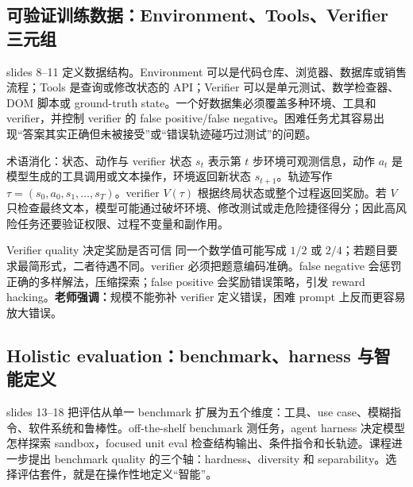 \subsection{可验证训练数据：Environment、Tools、Verifier 三元组}

slides 8--11 定义数据结构。Environment 可以是代码仓库、浏览器、数据库或销售流程；Tools 是查询或修改状态的 API；Verifier 可以是单元测试、数学检查器、DOM 脚本或 ground-truth state。一个好数据集必须覆盖多种环境、工具和 verifier，并控制 verifier 的 false positive/false negative。困难任务尤其容易出现“答案其实正确但未被接受”或“错误轨迹碰巧过测试”的问题。


\begin{knowledgebox}{术语消化：状态、动作与 verifier}
状态 $s_t$ 表示第 $t$ 步环境可观测信息，动作 $a_t$ 是模型生成的工具调用或文本操作，环境返回新状态 $s_{t+1}$。轨迹写作 $\tau=(s_0,a_0,s_1,\ldots,s_T)$。verifier $V(\tau)$ 根据终局状态或整个过程返回奖励。若 $V$ 只检查最终文本，模型可能通过破坏环境、修改测试或走危险捷径得分；因此高风险任务还要验证权限、过程不变量和副作用。
\end{knowledgebox}

\begin{warningbox}{Verifier quality 决定奖励是否可信}
同一个数学值可能写成 $1/2$ 或 $2/4$；若题目要求最简形式，二者待遇不同。verifier 必须把题意编码准确。false negative 会惩罚正确的多样解法，压缩探索；false positive 会奖励错误策略，引发 reward hacking。\textbf{老师强调：}规模不能弥补 verifier 定义错误，困难 prompt 上反而更容易放大错误。
\end{warningbox}

\subsection{Holistic evaluation：benchmark、harness 与智能定义}

slides 13--18 把评估从单一 benchmark 扩展为五个维度：工具、use case、模糊指令、软件系统和鲁棒性。off-the-shelf benchmark 测任务，agent harness 决定模型怎样探索 sandbox，focused unit eval 检查结构输出、条件指令和长轨迹。课程进一步提出 benchmark quality 的三个轴：hardness、diversity 和 separability。选择评估套件，就是在操作性地定义“智能”。

